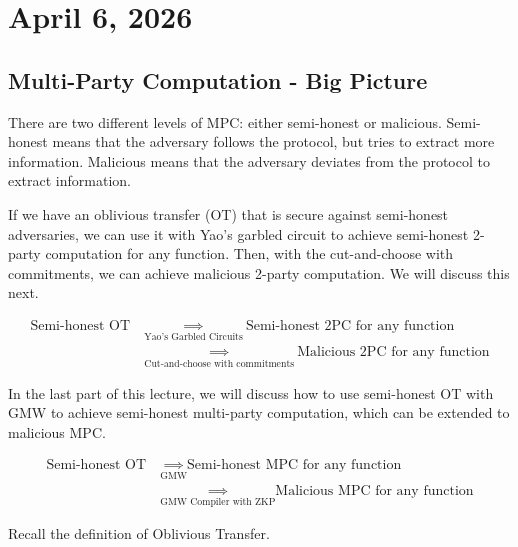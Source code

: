 \section{April 6, 2026}
\label{20260406}

\subsection{Multi-Party Computation - Big Picture}

There are two different levels of MPC: either semi-honest or malicious. Semi-honest means that the adversary follows the protocol, but tries to extract more information. Malicious means that the adversary deviates from the protocol to extract information.

If we have an oblivious transfer (OT) that is secure against semi-honest adversaries, we can use it with Yao's garbled circuit to achieve semi-honest 2-party computation for any function. Then, with the cut-and-choose with commitments, we can achieve malicious 2-party computation. We will discuss this next.

\begin{align*}
    \text{Semi-honest OT}\ & \underset{\text{Yao's Garbled Circuits}}{\implies}\ \text{Semi-honest 2PC for any function} \\
    & \underset{\text{Cut-and-choose with commitments}}{\implies}\ \text{Malicious 2PC for any function}
\end{align*}

In the last part of this lecture, we will discuss how to use semi-honest OT with GMW to achieve semi-honest multi-party computation, which can be extended to malicious MPC.

\begin{align*}
    \text{Semi-honest OT} \ & \underset{\text{GMW}}{\implies} \text{Semi-honest MPC for any function}\\
    & \underset{\text{GMW Compiler with ZKP}}{\implies} \text{Malicious MPC for any function}
\end{align*}

Recall the definition of Oblivious Transfer.

